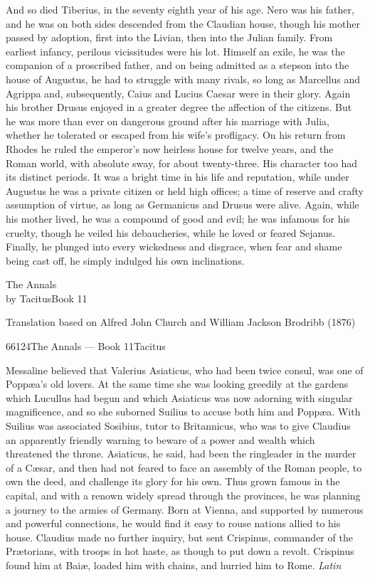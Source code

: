 And so died Tiberius, in the seventy eighth year of his age. Nero was his father, and he was on both sides descended from the Claudian house, though his mother passed by adoption, first into the Livian, then into the Julian family. From earliest infancy, perilous vicissitudes were his lot. Himself an exile, he was the companion of a proscribed father, and on being admitted as a stepson into the house of Augustus, he had to struggle with many rivals, so long as Marcellus and Agrippa and, subsequently, Caius and Lucius Caesar were in their glory. Again his brother Drusus enjoyed in a greater degree the affection of the citizens. But he was more than ever on dangerous ground after his marriage with Julia, whether he tolerated or escaped from his wife's profligacy. On his return from Rhodes he ruled the emperor's now heirless house for twelve years, and the Roman world, with absolute sway, for about twenty-three. His character too had its distinct periods. It was a bright time in his life and reputation, while under Augustus he was a private citizen or held high offices; a time of reserve and crafty assumption of virtue, as long as Germanicus and Drusus were alive. Again, while his mother lived, he was a compound of good and evil; he was infamous for his cruelty, though he veiled his debaucheries, while he loved or feared Sejanus. Finally, he plunged into every wickedness and disgrace, when fear and shame being cast off, he simply indulged his own inclinations.


The Annals\\
by TacitusBook 11

Translation based on Alfred John Church and William Jackson Brodribb (1876)

66124The Annals — Book 11Tacitus


Messaline believed that Valerius Asiaticus, who had been twice consul, was one of Poppæa's old lovers. At the same time she was looking greedily at the gardens which Lucullus had begun and which Asiaticus was now adorning with singular magnificence, and so she suborned Suilius to accuse both him and Poppæa. With Suilius was associated Sosibius, tutor to Britannicus, who was to give Claudius an apparently friendly warning to beware of a power and wealth which threatened the throne. Asiaticus, he said, had been the ringleader in the murder of a Cæsar, and then had not feared to face an assembly of the Roman people, to own the deed, and challenge its glory for his own. Thus grown famous in the capital, and with a renown widely spread through the provinces, he was planning a journey to the armies of Germany. Born at Vienna, and supported by numerous and powerful connections, he would find it easy to rouse nations allied to his house. Claudius made no further inquiry, but sent Crispinus, commander of the Prætorians, with troops in hot haste, as though to put down a revolt. Crispinus found him at Baiæ, loaded him with chains, and hurried him to Rome. \emph{Latin}

